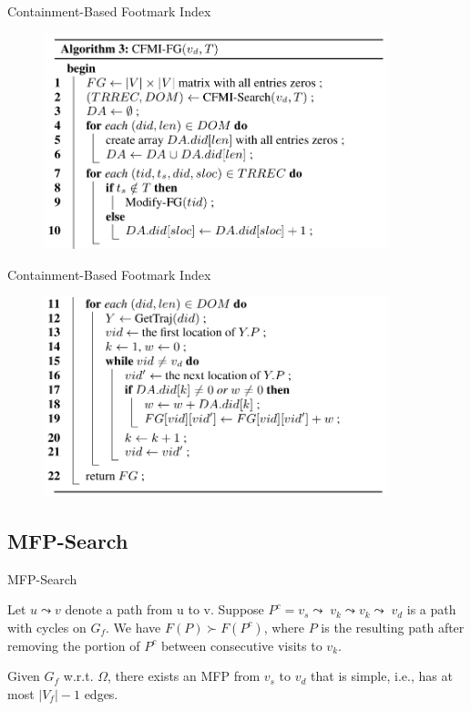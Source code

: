 \documentclass[mathserif]{beamer}
\begin{document}
\begin{frame}{Containment-Based Footmark Index}
\begin{figure}
\includegraphics[width = 10cm]{alg3_1.png}
\end{figure}
\end{frame}

\begin{frame}{Containment-Based Footmark Index}
\begin{figure}
\includegraphics[width = 10cm]{alg3_2.png}
\end{figure}
\end{frame}

\subsection{MFP-Search}

\begin{frame}{MFP-Search}
\begin{lemm}
Let $u \leadsto{} v$ denote a path from u to v. Suppose $P^c =v_s \leadsto{} 􏰁v_k \leadsto{} v_k \leadsto{} 􏰁v_d$ is a path with cycles on $G_f$. We have $F (P ) \succ{} F (P^c )$, where $P$ is the resulting path after removing the portion of $P^c$ between consecutive visits to $v_k$.
\end{lemm}
\begin{lemm}
Given $G_f$ w.r.t. $\Omega{}$, there exists an MFP from $v_s$ to $v_d$ that is simple, i.e., has at most $|V_f| − 1$ edges.
\end{lemm}
\end{frame}
\end{document}
